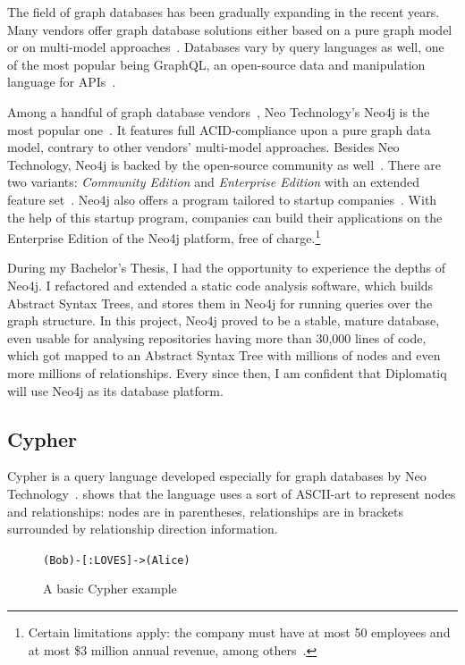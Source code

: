 The field of graph databases has been gradually expanding in the recent years. Many vendors offer graph database solutions either based on a pure graph model or on multi-model approaches~\cite{arangodb-graph, datastax-graph, orientdb-graph}. Databases vary by query languages as well, one of the most popular being GraphQL, an open-source data and manipulation language for APIs~\cite{graphql}.

Among a handful of graph database vendors~\cite{graph-dbs}, Neo Technology's Neo4j is the most popular one~\cite{graph-dbs-raking}. It features full ACID-compliance upon a pure graph data model, contrary to other vendors' multi-model approaches. Besides Neo Technology, Neo4j is backed by the open-source community as well~\cite{neo4j-github}. There are two variants: \emph{Community Edition} and \emph{Enterprise Edition} with an extended feature set~\cite{neo4j-licensing}. Neo4j also offers a program tailored to startup companies~\cite{neo4j-startup-program}. With the help of this startup program, companies can build their applications on the Enterprise Edition of the Neo4j platform, free of charge.\footnote{Certain limitations apply: the company must have at most 50 employees and at most \$3 million annual revenue, among others~\cite{neo4j-startup-program}.}

During my Bachelor's Thesis, I had the opportunity to experience the depths of Neo4j. I refactored and extended a static code analysis software, which builds Abstract Syntax Trees, and stores them in Neo4j for running queries over the graph structure. In this project, Neo4j proved to be a stable, mature database, even usable for analysing repositories having more than 30,000 lines of code, which got mapped to an Abstract Syntax Tree with millions of nodes and even more millions of relationships. Every since then, I am confident that Diplomatiq will use Neo4j as its database platform.

\subsection{Cypher}

Cypher is a query language developed especially for graph databases by Neo Technology~\cite{neo4j-cypher}.  shows that the language uses a sort of ASCII-art to represent nodes and relationships: nodes are in parentheses, relationships are in brackets surrounded by relationship direction information.

\begin{figure}[!htb]
    \centering
    \lstinline{(Bob)-[:LOVES]->(Alice)}
    \caption{A basic Cypher example}
    \label{fig:cypher-intro}
\end{figure}


